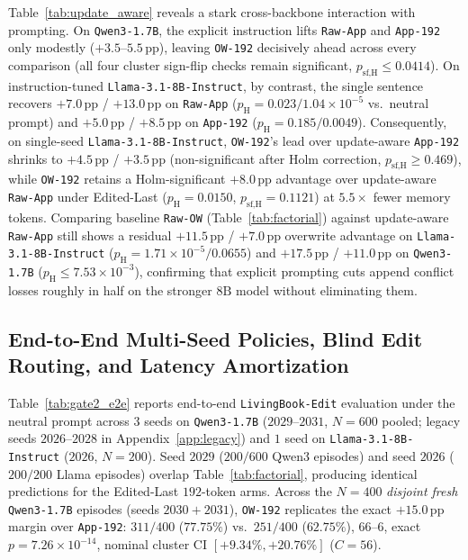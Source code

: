 \documentclass[10pt]{article}
\newcommand{\pp}{\,\text{pp}}
\renewcommand{\_}{\origunderscore\allowbreak}
\begin{document}
Table~\ref{tab:update_aware} reveals a stark cross-backbone interaction with prompting. On \texttt{Qwen3-1.7B}, the explicit instruction lifts \texttt{Raw-App} and \texttt{App-192} only modestly ($+3.5$--$5.5\pp$), leaving \texttt{OW-192} decisively ahead across every comparison (all four cluster sign-flip checks remain significant, $p_{\text{sf,H}} \le 0.0414$). On instruction-tuned \texttt{Llama-3.1-8B-Instruct}, by contrast, the single sentence recovers $+7.0\pp$ / $+13.0\pp$ on \texttt{Raw-App} ($p_{\text{H}} = 0.023 / 1.04\times 10^{-5}$ vs.\ neutral prompt) and $+5.0\pp$ / $+8.5\pp$ on \texttt{App-192} ($p_{\text{H}} = 0.185 / 0.0049$). Consequently, on single-seed \texttt{Llama-3.1-8B-Instruct}, \texttt{OW-192}'s lead over update-aware \texttt{App-192} shrinks to $+4.5\pp$ / $+3.5\pp$ (non-significant after Holm correction, $p_{\text{sf,H}} \ge 0.469$), while \texttt{OW-192} retains a Holm-significant $+8.0\pp$ advantage over update-aware \texttt{Raw-App} under Edited-Last ($p_{\text{H}}=0.0150$, $p_{\text{sf,H}}=0.1121$) at $5.5\times$ fewer memory tokens. Comparing baseline \texttt{Raw-OW} (Table~\ref{tab:factorial}) against update-aware \texttt{Raw-App} still shows a residual $+11.5\pp$ / $+7.0\pp$ overwrite advantage on \texttt{Llama-3.1-8B-Instruct} ($p_{\text{H}} = 1.71\times 10^{-5} / 0.0655$) and $+17.5\pp$ / $+11.0\pp$ on \texttt{Qwen3-1.7B} ($p_{\text{H}} \le 7.53\times 10^{-3}$), confirming that explicit prompting cuts append conflict losses roughly in half on the stronger $8\text{B}$ model without eliminating them.

\subsection{End-to-End Multi-Seed Policies, Blind Edit Routing, and Latency Amortization}
\label{sec:gate2_e2e}
Table~\ref{tab:gate2_e2e} reports end-to-end \texttt{LivingBook-Edit} evaluation under the neutral prompt across $3$ seeds on \texttt{Qwen3-1.7B} ($2029$--$2031$, $N=600$ pooled; legacy seeds $2026$--$2028$ in Appendix~\ref{app:legacy}) and $1$ seed on \texttt{Llama-3.1-8B-Instruct} ($2026$, $N=200$). Seed $2029$ ($200/600$ Qwen3 episodes) and seed $2026$ ($200/200$ Llama episodes) overlap Table~\ref{tab:factorial}, producing identical predictions for the Edited-Last $192$-token arms. Across the $N=400$ \emph{disjoint fresh} \texttt{Qwen3-1.7B} episodes (seeds $2030 + 2031$), \texttt{OW-192} replicates the exact $+15.0\pp$ margin over \texttt{App-192}: $311/400$ ($77.75\%$) vs.\ $251/400$ ($62.75\%$), $66$--$6$, exact $p=7.26\times 10^{-14}$, nominal cluster CI $[+9.34\%, +20.76\%]$ ($C=56$).
\end{document}
